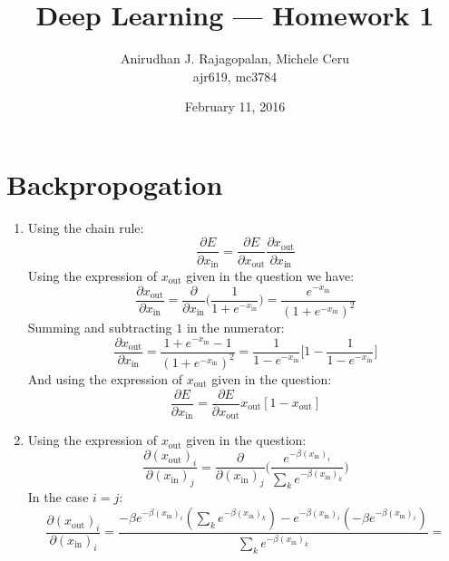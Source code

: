\documentclass{article}
\begin{document}
\title{Deep Learning --- Homework 1}
\date{February 11, 2016}
\author{Anirudhan J. Rajagopalan, Michele Ceru\\ ajr619, mc3784}

\maketitle

\newpage

\section[Expression for energy]{Backpropogation}
\begin{enumerate}
\item Using the chain rule:
$$
\frac{\partial E}{\partial x_{\text{in}}} = \frac{\partial E}{\partial x_{\text{out}}}\frac{\partial x_{\text{out}}}{\partial x_{\text{in}}}
$$  
Using the expression of $x_{\text{out}}$ given in the question we have:
$$
\frac{\partial x_{\text{out}}}{\partial x_{\text{in}}} = \frac{\partial }{\partial x_{\text{in}}} \big(\frac{1}{1+e^{-x_{\text{in}}}}\big) = \frac{e^{-x_{\text{in}}} }{(1+e^{-x_{\text{in}}})^2}
$$
Summing and subtracting $1$ in the numerator:
$$
\frac{\partial x_{\text{out}}}{\partial x_{\text{in}}}  = \frac{1+e^{-x_{\text{in}}} -1}{(1+e^{-x_{\text{in}}})^2}=\frac{1}{1-e^{-x_{\text{in}}}}\Big[  1-\frac{1}{1-e^{-x_{\text{in}}}}\Big]
$$
And using the expression of $x_{\text{out}}$ given in the question:
$$
\frac{\partial E}{\partial x_{\text{in}}} =\frac{\partial E}{\partial x_{\text{out}}}x_{\text{out}}[1-x_{\text{out}}]
$$

\item Using the expression of $x_{\text{out}}$ given in the question:
$$
\frac{\partial (x_{\text{out}})_i}{\partial (x_{\text{in}})_j} = \frac{\partial }{\partial (x_{\text{in}})_j} \Big(  
\frac{e^{-\beta (x_{\text{in}})_i}}{\sum_k e^{-\beta (x_{\text{in}})_k}}
\Big)
$$
In the case $i=j$:
$$
\frac{\partial (x_{\text{out}})_i}{\partial (x_{\text{in}})_i} =    
\frac{-\beta e^{-\beta (x_{\text{in}})_i} (\sum_k e^{-\beta (x_{\text{in}})_k} )- e^{-\beta (x_{\text{in}})_i} (-\beta e^{-\beta (x_{\text{in}})_i}   )
}
{\sum_k e^{-\beta (x_{\text{in}})_k}}=
$$


\end{enumerate}
\end{document}
